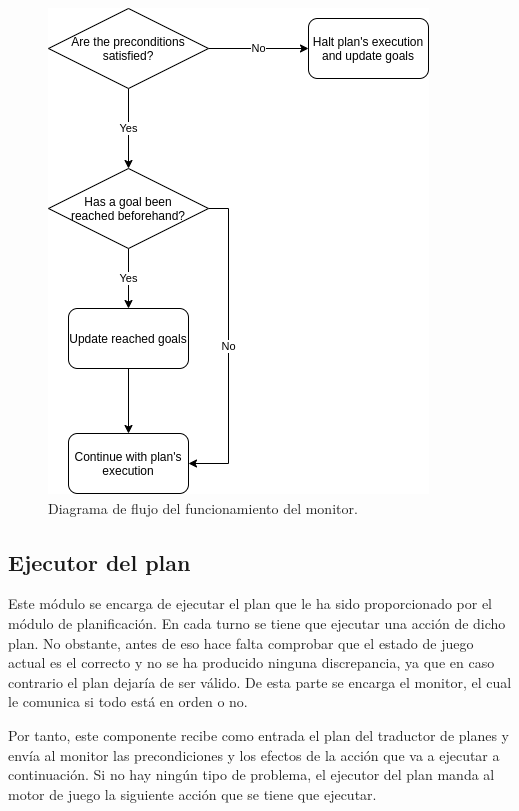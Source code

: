 \begin{figure}[H]
    \centering
    \includegraphics[scale=0.45]{img/CH05/flux_monitor.png}
    \caption{Diagrama de flujo del funcionamiento del monitor.}
    \label{fig:flux-monitor}
\end{figure}

\subsection{Ejecutor del plan}

Este módulo se encarga de ejecutar el plan que le ha sido proporcionado por el módulo de planificación.
En cada turno se tiene que ejecutar una acción de dicho plan. No obstante, antes de eso hace falta
comprobar que el estado de juego actual es el correcto y no se ha producido ninguna discrepancia, ya
que en caso contrario el plan dejaría de ser válido. De esta parte se encarga el monitor, el cual
le comunica si todo está en orden o no.

Por tanto, este componente recibe como entrada el plan del traductor de planes y envía al monitor
las precondiciones y los efectos de la acción que va a ejecutar a continuación. Si no hay ningún
tipo de problema, el ejecutor del plan manda al motor de juego la siguiente acción que se
tiene que ejecutar.
